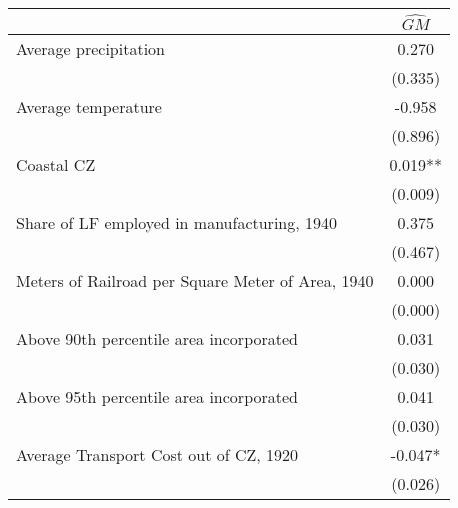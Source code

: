  \begin{tabular}{l*{1}{c}} \toprule
                &\multicolumn{1}{c}{$\widehat{GM}$}\\
\midrule
Average precipitation&    0.270   \\
                &  (0.335)   \\
\addlinespace
Average temperature&   -0.958   \\
                &  (0.896)   \\
\addlinespace
Coastal CZ      &    0.019** \\
                &  (0.009)   \\
\addlinespace
Share of LF employed in manufacturing, 1940&    0.375   \\
                &  (0.467)   \\
\addlinespace
Meters of Railroad per Square Meter of Area, 1940&    0.000   \\
                &  (0.000)   \\
\addlinespace
Above 90th percentile area incorporated&    0.031   \\
                &  (0.030)   \\
\addlinespace
Above 95th percentile area incorporated&    0.041   \\
                &  (0.030)   \\
\addlinespace
Average Transport Cost out of CZ, 1920&   -0.047*  \\
                &  (0.026)   \\
       \bottomrule \end{tabular}

